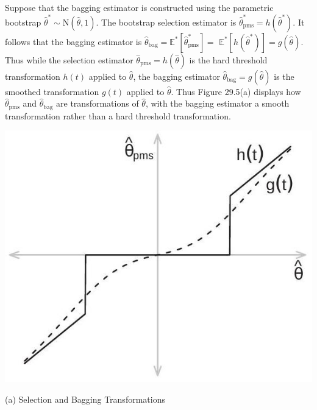 \documentclass[10pt]{article}
\begin{document}
Suppose that the bagging estimator is constructed using the parametric bootstrap $\widehat{\theta}^{*} \sim \mathrm{N}(\widehat{\theta}, 1)$. The bootstrap selection estimator is $\widehat{\theta}_{\mathrm{pms}}^{*}=h\left(\widehat{\theta}^{*}\right)$. It follows that the bagging estimator is $\widehat{\theta}_{\mathrm{bag}}=\mathbb{E}^{*}\left[\widehat{\theta}_{\mathrm{pms}}^{*}\right]=$ $\mathbb{E}^{*}\left[h\left(\widehat{\theta}^{*}\right)\right]=g(\widehat{\theta})$. Thus while the selection estimator $\widehat{\theta}_{\mathrm{pms}}=h(\widehat{\theta})$ is the hard threshold transformation $h(t)$ applied to $\widehat{\theta}$, the bagging estimator $\widehat{\theta}_{\mathrm{bag}}=g(\widehat{\theta})$ is the smoothed transformation $g(t)$ applied to $\widehat{\theta}$. Thus Figure 29.5(a) displays how $\widehat{\theta}_{\mathrm{pms}}$ and $\hat{\theta}_{\mathrm{bag}}$ are transformations of $\widehat{\theta}$, with the bagging estimator a smooth transformation rather than a hard threshold transformation.

\begin{center}
\includegraphics[max width=\textwidth]{2022_11_27_70699ac9776c9435969dg-20}
\end{center}

(a) Selection and Bagging Transformations
\end{document}
